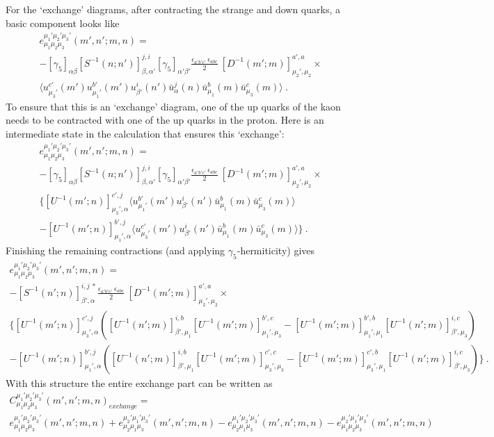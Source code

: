 \documentclass[%
 preprint,
nofootinbib,
 amsmath,amssymb,
 aps,
]{revtex4-2}
\begin{document}
For the `exchange' diagrams, after contracting the strange and down quarks, a basic component looks like
\begin{multline}
e^{\mu_1'\mu_2'\mu_3'}_{\mu_1\mu_2\mu_3}(m',n';m,n)=\\
-[\gamma_5]_{\alpha\beta}[S^{-1}(n;n')]_{\beta,\alpha'}^{j,i}[\gamma_5]_{\alpha'\beta'}\frac{ \epsilon_{a'b'c'}\ \epsilon_{abc}}{2}\ [D^{-1}(m';m)]_{\mu_2',\mu_2}^{a',a}\times\\
\langle 
u^{c'}_{\mu_3'}(m')u^{b'}_{\mu_1'}(m')
u_{\beta'}^i(n')
\bar{u}_{\alpha}^j(n)
\bar{u}^b_{\mu_1}(m)\bar{u}^c_{\mu_3}(m)\rangle\ .
\end{multline}
To ensure that this is an `exchange' diagram, one of the up quarks of the kaon needs to be contracted with one of the up quarks in the proton.  Here is an intermediate state in the calculation that ensures this `exchange':
\begin{multline}
e^{\mu_1'\mu_2'\mu_3'}_{\mu_1\mu_2\mu_3}(m',n';m,n)=\\
-[\gamma_5]_{\alpha\beta}[S^{-1}(n;n')]_{\beta,\alpha'}^{j,i}[\gamma_5]_{\alpha'\beta'}\frac{ \epsilon_{a'b'c'}\ \epsilon_{abc}}{2}\ [D^{-1}(m';m)]_{\mu_2',\mu_2}^{a',a}\times\\
\{[U^{-1}(m';n)]_{\mu_3',\alpha}^{c',j} \langle u^{b'}_{\mu_1'}(m')u_{\beta'}^i(n')
\bar{u}^b_{\mu_1}(m)\bar{u}^c_{\mu_3}(m)\rangle\\
-[U^{-1}(m';n)]_{\mu_1',\alpha}^{b',j}\langle u^{c'}_{\mu_3'}(m')u_{\beta'}^i(n')\bar{u}^b_{\mu_1}(m)\bar{u}^c_{\mu_3}(m)\rangle\}\ .
\end{multline}
Finishing the remaining contractions (and applying $\gamma_5$-hermiticity) gives
\begin{multline}
e^{\mu_1'\mu_2'\mu_3'}_{\mu_1\mu_2\mu_3}(m',n';m,n)=\\
-[S^{-1}(n';n)]_{\beta',\alpha}^{i,j\ *}\frac{ \epsilon_{a'b'c'}\ \epsilon_{abc}}{2}\ [D^{-1}(m';m)]_{\mu_2',\mu_2}^{a',a}\times\\
\{[U^{-1}(m';n)]_{\mu_3',\alpha}^{c',j} ([U^{-1}(n';m)]_{\beta',\mu_1}^{i,b} [U^{-1}(m';m)]_{\mu_1',\mu_3}^{b',c} -
[U^{-1}(m';m)]_{\mu_1',\mu_1}^{b',b} [U^{-1}(n';m)]_{\beta',\mu_3}^{i,c} )\\
-[U^{-1}(m';n)]_{\mu_1',\alpha}^{b',j}
([U^{-1}(n';m)]_{\beta',\mu_1}^{i,b} [U^{-1}(m';m)]_{\mu_3',\mu_3}^{c',c} -
[U^{-1}(m';m)]_{\mu_3',\mu_1}^{c',b} [U^{-1}(n';m)]_{\beta',\mu_3}^{i,c} )\}\ .
\end{multline}
With this structure the entire exchange part can be written as
\begin{multline}
C^{\mu_1'\mu_2'\mu_3'}_{\mu_1\mu_2\mu_3}(m',n';m,n)_{exchange}=\\
e^{\mu_1'\mu_2'\mu_3'}_{\mu_1\mu_2\mu_3}(m',n';m,n)+e^{\mu_2'\mu_1'\mu_3'}_{\mu_2\mu_1\mu_3}(m',n';m,n)-
e^{\mu_1'\mu_2'\mu_3'}_{\mu_2\mu_1\mu_3}(m',n';m,n)-e^{\mu_2'\mu_1'\mu_3'}_{\mu_1\mu_2\mu_3}(m',n';m,n)
\end{multline}
\end{document}
